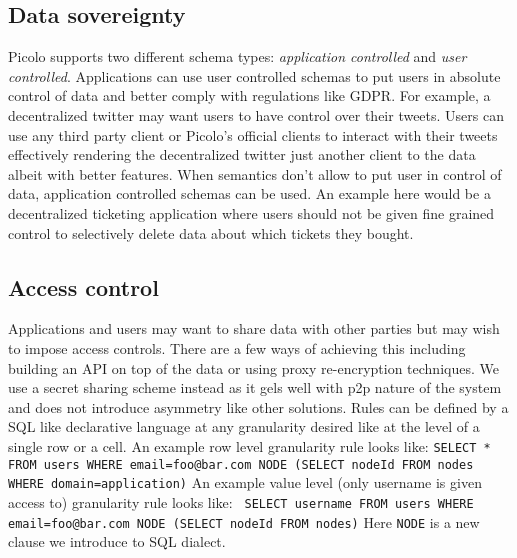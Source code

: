 \subsection{Data sovereignty}
Picolo supports two different schema types: \textit{application controlled} and \textit{user controlled}. Applications can use user controlled schemas to put users in absolute control of data and better comply with regulations like GDPR. For example, a decentralized twitter may  want users to have control over their tweets. Users can use any third party client or Picolo's official clients to interact with their tweets effectively rendering the decentralized twitter just another client to the data albeit with better features. \newline\newline
When semantics don't allow to put user in control of data, application controlled schemas can be used. An example here would be a decentralized ticketing application where users should not be given fine grained control to selectively delete data about which tickets they bought.
\subsection{Access control}
Applications and users may want to share data with other parties but may wish to impose access controls. There are a few ways of achieving this including building an API on top of the data or using proxy re-encryption techniques. We use a secret sharing scheme instead as it gels well with p2p nature of the system and does not introduce asymmetry like other solutions. Rules can be defined by a SQL like declarative language at any granularity desired like at the level of a single row or a cell. An example row level granularity rule looks like:\newline \newline
\texttt{SELECT  * \newline FROM users \newline WHERE email=foo@bar.com \newline NODE (SELECT nodeId FROM nodes WHERE domain=application)} \newline \newline
An example value level (only username is given access to) granularity rule looks like:\newline \newline
\texttt{ SELECT username \newline FROM users \newline WHERE email=foo@bar.com \newline NODE (SELECT nodeId FROM nodes)}\newline\newline
Here \texttt{NODE} is a new clause we introduce to SQL dialect.
